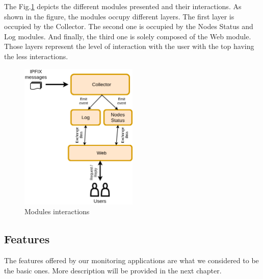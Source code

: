 The Fig.\ref{fig:modules} depicts the different modules presented and their interactions. As shown in the figure, the modules occupy different layers. The first layer is occupied by the Collector. The second one is occupied by the Nodes Status and Log modules. And finally, the third one is solely composed of the Web module. Those layers represent the level of interaction with the user with the top having the less interactions.

\begin{figure}
	\centering
	\includegraphics[width=0.5\textwidth]{res/modules.png}
	\caption{Modules interactions}
	\label{fig:modules}
\end{figure}

\subsection{Features}

The features offered by our monitoring applications are what we considered to be the basic ones. More description will be provided in the next chapter.

